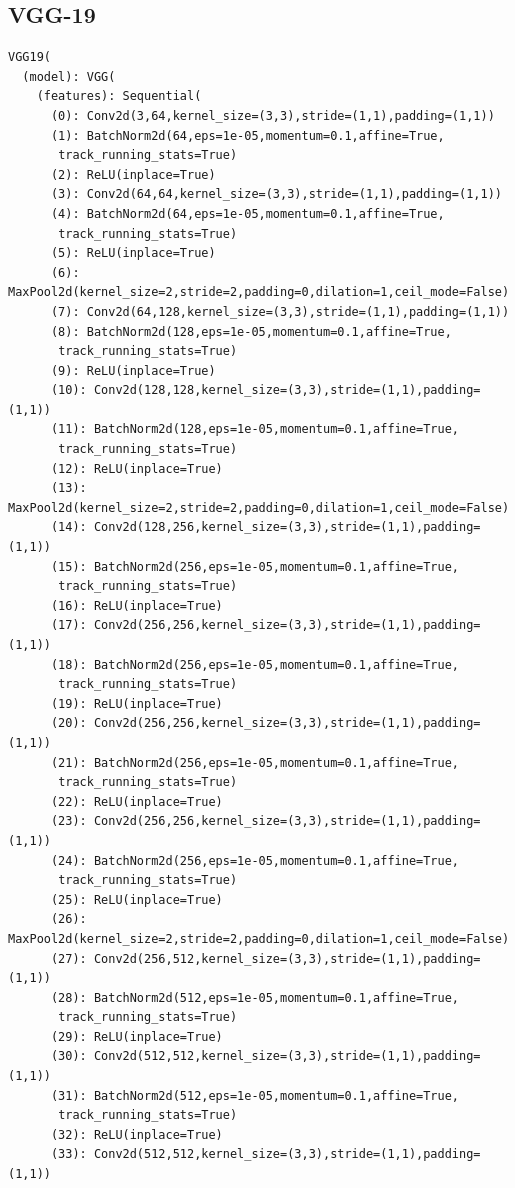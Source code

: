 \documentclass{article}
\begin{document}
\subsection*{VGG-19}
\begin{verbatim}
VGG19(
  (model): VGG(
    (features): Sequential(
      (0): Conv2d(3,64,kernel_size=(3,3),stride=(1,1),padding=(1,1))
      (1): BatchNorm2d(64,eps=1e-05,momentum=0.1,affine=True,
       track_running_stats=True)
      (2): ReLU(inplace=True)
      (3): Conv2d(64,64,kernel_size=(3,3),stride=(1,1),padding=(1,1))
      (4): BatchNorm2d(64,eps=1e-05,momentum=0.1,affine=True,
       track_running_stats=True)
      (5): ReLU(inplace=True)
      (6): MaxPool2d(kernel_size=2,stride=2,padding=0,dilation=1,ceil_mode=False)
      (7): Conv2d(64,128,kernel_size=(3,3),stride=(1,1),padding=(1,1))
      (8): BatchNorm2d(128,eps=1e-05,momentum=0.1,affine=True,
       track_running_stats=True)
      (9): ReLU(inplace=True)
      (10): Conv2d(128,128,kernel_size=(3,3),stride=(1,1),padding=(1,1))
      (11): BatchNorm2d(128,eps=1e-05,momentum=0.1,affine=True,
       track_running_stats=True)
      (12): ReLU(inplace=True)
      (13): MaxPool2d(kernel_size=2,stride=2,padding=0,dilation=1,ceil_mode=False)
      (14): Conv2d(128,256,kernel_size=(3,3),stride=(1,1),padding=(1,1))
      (15): BatchNorm2d(256,eps=1e-05,momentum=0.1,affine=True,
       track_running_stats=True)
      (16): ReLU(inplace=True)
      (17): Conv2d(256,256,kernel_size=(3,3),stride=(1,1),padding=(1,1))
      (18): BatchNorm2d(256,eps=1e-05,momentum=0.1,affine=True,
       track_running_stats=True)
      (19): ReLU(inplace=True)
      (20): Conv2d(256,256,kernel_size=(3,3),stride=(1,1),padding=(1,1))
      (21): BatchNorm2d(256,eps=1e-05,momentum=0.1,affine=True,
       track_running_stats=True)
      (22): ReLU(inplace=True)
      (23): Conv2d(256,256,kernel_size=(3,3),stride=(1,1),padding=(1,1))
      (24): BatchNorm2d(256,eps=1e-05,momentum=0.1,affine=True,
       track_running_stats=True)
      (25): ReLU(inplace=True)
      (26): MaxPool2d(kernel_size=2,stride=2,padding=0,dilation=1,ceil_mode=False)
      (27): Conv2d(256,512,kernel_size=(3,3),stride=(1,1),padding=(1,1))
      (28): BatchNorm2d(512,eps=1e-05,momentum=0.1,affine=True,
       track_running_stats=True)
      (29): ReLU(inplace=True)
      (30): Conv2d(512,512,kernel_size=(3,3),stride=(1,1),padding=(1,1))
      (31): BatchNorm2d(512,eps=1e-05,momentum=0.1,affine=True,
       track_running_stats=True)
      (32): ReLU(inplace=True)
      (33): Conv2d(512,512,kernel_size=(3,3),stride=(1,1),padding=(1,1))

\end{verbatim}
\end{document}
